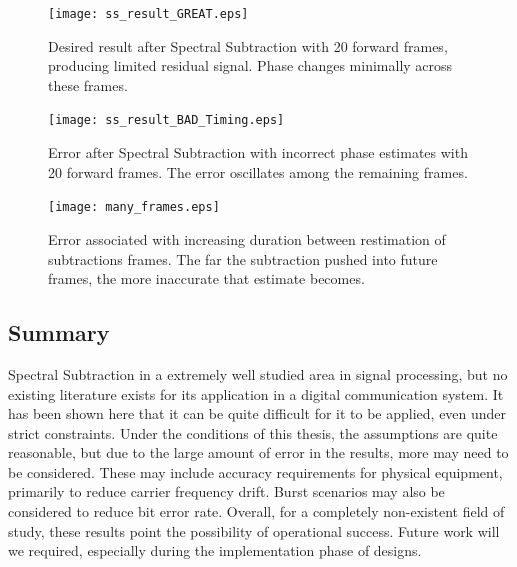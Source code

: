 \begin{figure}
\centering
\texttt{[image: ss\_result\_GREAT.eps]}
\caption{Desired result after Spectral Subtraction with 20 forward frames, producing limited residual signal.  Phase changes minimally across these frames.}
\label{ss_result_great}
\end{figure}

\begin{figure}
\centering
\texttt{[image: ss\_result\_BAD\_Timing.eps]}
\caption{Error after Spectral Subtraction with incorrect phase estimates with 20 forward frames.  The error oscillates among the remaining frames.}
\label{ss_result_bad}
\end{figure}

\begin{figure}
\centering
\texttt{[image: many\_frames.eps]}
\caption{Error associated with increasing duration between restimation of subtractions frames.  The far the subtraction pushed into future frames, the more inaccurate that estimate becomes.}
\label{many_frames}
\end{figure}




\subsection{Summary}

Spectral Subtraction in a extremely well studied area in signal processing, but no existing literature exists for its application in a digital communication system.  It has been shown here that it can be quite difficult for it to be applied, even under strict constraints.  Under the conditions of this thesis, the assumptions are quite reasonable, but due to the large amount of error in the results, more may need to be considered.  These may include accuracy requirements for physical equipment, primarily to reduce carrier frequency drift.  Burst scenarios may also be considered to reduce bit error rate.  Overall, for a completely non-existent field of study, these results point the possibility of operational success.  Future work will we required, especially during the implementation phase of designs.\\

